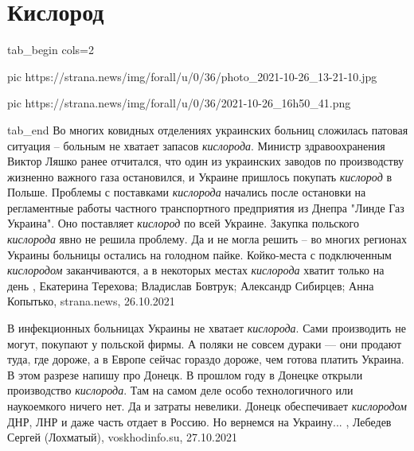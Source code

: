  
 
 
 
 
\chapter{Кислород}
\label{sec:slova.kislorod}

\ifcmt
  tab_begin cols=2

     pic https://strana.news/img/forall/u/0/36/photo_2021-10-26_13-21-10.jpg

     pic https://strana.news/img/forall/u/0/36/2021-10-26_16h50_41.png

  tab_end
\fi
Во многих ковидных отделениях украинских больниц сложилась патовая ситуация –
больным не хватает запасов \emph{кислорода}.  Министр здравоохранения Виктор Ляшко
ранее отчитался, что один из украинских заводов по производству жизненно
важного газа остановился, и Украине пришлось покупать \emph{кислород} в Польше.
Проблемы с поставками \emph{кислорода} начались после остановки на регламентные работы
частного транспортного предприятия из Днепра "Линде Газ Украина". Оно
поставляет \emph{кислород} по всей Украине.  Закупка польского \emph{кислорода} явно не
решила проблему. Да и не могла решить – во многих регионах Украины больницы
остались на голодном пайке. Койко-места с подключенным \emph{кислородом}
заканчиваются, а в некоторых местах \emph{кислорода} хватит только на день
, 
Екатерина Терехова; Владислав Бовтрук; Александр Сибирцев; Анна Копытько, strana.news, 26.10.2021

В инфекционных больницах Украины не хватает \emph{кислорода}. Сами производить не
могут, покупают у польской фирмы. А поляки не совсем дураки — они продают туда,
где дороже, а в Европе сейчас гораздо дороже, чем готова платить Украина. В
этом разрезе напишу про Донецк. В прошлом году в Донецке открыли производство
\emph{кислорода}. Там на самом деле особо технологичного или наукоемкого ничего нет.
Да и затраты невелики. Донецк обеспечивает \emph{кислородом} ДНР, ЛНР и даже часть
отдает в Россию. Но вернемся на Украину...
, 
Лебедев Сергей (Лохматый), voskhodinfo.su, 27.10.2021
